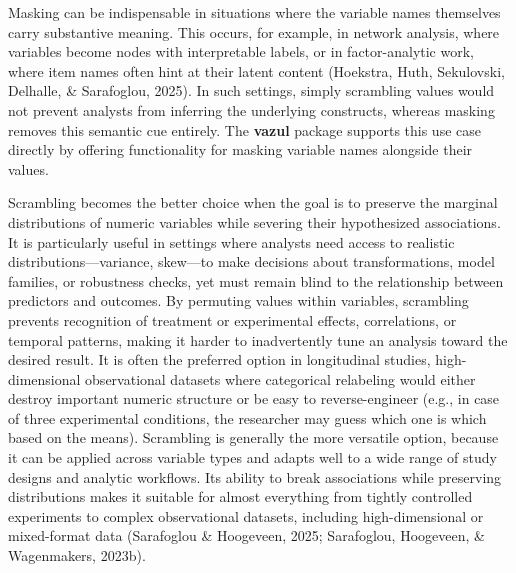 \documentclass[
  english,
  man,floatsintext]{apa6}
\begin{document}
Masking can be indispensable in situations where the variable names themselves carry substantive meaning. This occurs, for example, in network analysis, where variables become nodes with interpretable labels, or in factor-analytic work, where item names often hint at their latent content (Hoekstra, Huth, Sekulovski, Delhalle, \& Sarafoglou, 2025). In such settings, simply scrambling values would not prevent analysts from inferring the underlying constructs, whereas masking removes this semantic cue entirely. The \textbf{vazul} package supports this use case directly by offering functionality for masking variable names alongside their values.

Scrambling becomes the better choice when the goal is to preserve the marginal distributions of numeric variables while severing their hypothesized associations. It is particularly useful in settings where analysts need access to realistic distributions---variance, skew---to make decisions about transformations, model families, or robustness checks, yet must remain blind to the relationship between predictors and outcomes. By permuting values within variables, scrambling prevents recognition of treatment or experimental effects, correlations, or temporal patterns, making it harder to inadvertently tune an analysis toward the desired result. It is often the preferred option in longitudinal studies, high-dimensional observational datasets where categorical relabeling would either destroy important numeric structure or be easy to reverse-engineer (e.g., in case of three experimental conditions, the researcher may guess which one is which based on the means). Scrambling is generally the more versatile option, because it can be applied across variable types and adapts well to a wide range of study designs and analytic workflows. Its ability to break associations while preserving distributions makes it suitable for almost everything from tightly controlled experiments to complex observational datasets, including high-dimensional or mixed-format data (Sarafoglou \& Hoogeveen, 2025; Sarafoglou, Hoogeveen, \& Wagenmakers, 2023b).
\end{document}
